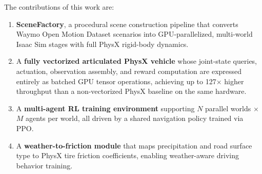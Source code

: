 
The contributions of this work are:
\begin{enumerate}[leftmargin=*, itemsep=2pt]
  \item \textbf{SceneFactory}, a procedural scene construction pipeline that converts Waymo Open Motion Dataset scenarios into GPU-parallelized, multi-world Isaac Sim stages with full PhysX rigid-body dynamics.
  \item A \textbf{fully vectorized articulated PhysX vehicle} whose joint-state queries, actuation, observation assembly, and reward computation are expressed entirely as batched GPU tensor operations, achieving up to 127$\times$ higher throughput than a non-vectorized PhysX baseline on the same hardware.
  \item A \textbf{multi-agent RL training environment} supporting $N$ parallel worlds $\times$ $M$ agents per world, all driven by a shared navigation policy trained via PPO.
  \item A \textbf{weather-to-friction module} that maps precipitation and road surface type to PhysX tire friction coefficients, enabling weather-aware driving behavior training.
\end{enumerate}

